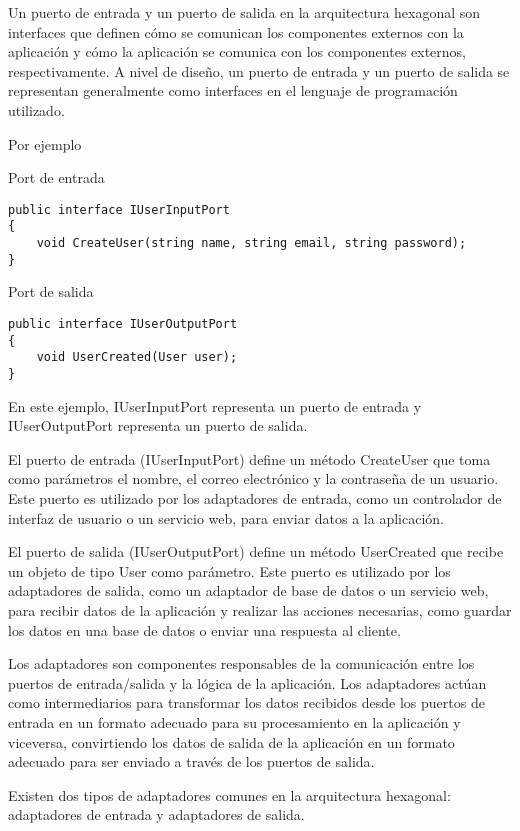 \documentclass[executivepaper]{article}
\begin{document}
Un puerto de entrada y un puerto de salida en la arquitectura hexagonal son interfaces que definen cómo se comunican los componentes externos con la aplicación y cómo la aplicación se comunica con los componentes externos, respectivamente. A nivel de diseño, un puerto de entrada y un puerto de salida se representan generalmente como interfaces en el lenguaje de programación utilizado.

Por ejemplo 

Port de entrada
\begin{lstlisting}
public interface IUserInputPort
{
    void CreateUser(string name, string email, string password);
}
\end{lstlisting}

Port de salida
\begin{lstlisting}
public interface IUserOutputPort
{
    void UserCreated(User user);
}
\end{lstlisting}

En este ejemplo, IUserInputPort representa un puerto de entrada y IUserOutputPort representa un puerto de salida.

El puerto de entrada (IUserInputPort) define un método CreateUser que toma como parámetros el nombre, el correo electrónico y la contraseña de un usuario. Este puerto es utilizado por los adaptadores de entrada, como un controlador de interfaz de usuario o un servicio web, para enviar datos a la aplicación.

El puerto de salida (IUserOutputPort) define un método UserCreated que recibe un objeto de tipo User como parámetro. Este puerto es utilizado por los adaptadores de salida, como un adaptador de base de datos o un servicio web, para recibir datos de la aplicación y realizar las acciones necesarias, como guardar los datos en una base de datos o enviar una respuesta al cliente.

Los adaptadores son componentes responsables de la comunicación entre los puertos de entrada/salida y la lógica de la aplicación. Los adaptadores actúan como intermediarios para transformar los datos recibidos desde los puertos de entrada en un formato adecuado para su procesamiento en la aplicación y viceversa, convirtiendo los datos de salida de la aplicación en un formato adecuado para ser enviado a través de los puertos de salida.

Existen dos tipos de adaptadores comunes en la arquitectura hexagonal: adaptadores de entrada y adaptadores de salida.
\end{document}
